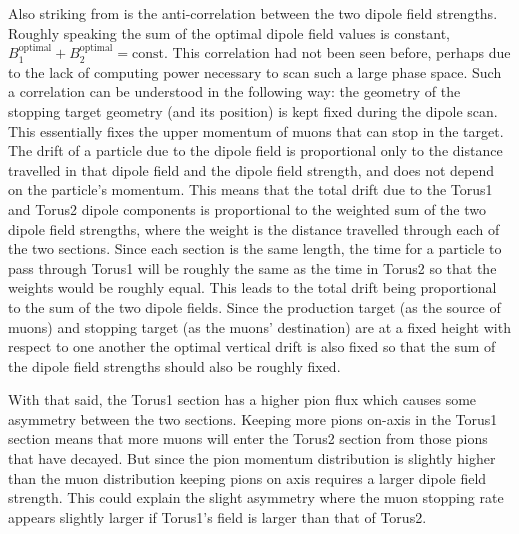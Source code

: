 Also striking from  is the anti-correlation between the two dipole field strengths.  
Roughly speaking the sum of the optimal dipole field values is constant, \ie $B_1^\text{optimal} + B_2^\text{optimal} = \text{const}$.
This correlation had not been seen before, perhaps due to the lack of computing power necessary to scan such a large phase space.
Such a correlation can be understood in the following way:
the geometry of the stopping target geometry (and its position) is kept fixed during the dipole scan.
This essentially fixes the upper momentum of muons that can stop in the target.
The drift of a particle due to the dipole field is proportional only to the distance travelled in that dipole field and the dipole field strength, and does not depend on the particle's momentum.
This means that the total drift due to the Torus1 and Torus2 dipole components is proportional to the weighted sum of the two dipole field strengths, where the weight is the distance travelled through each of the two sections.
Since each section is the same length, the time for a particle to pass through Torus1 will be roughly the same as the time in Torus2 so that the weights would be roughly equal.
This leads to the total drift being proportional to the sum of the two dipole fields.
Since the production target (as the source of muons) and stopping target (as the muons' destination) are at a fixed height with respect to one another the optimal vertical drift is also fixed so that the sum of the dipole field strengths should also be roughly fixed.

With that said, the Torus1 section has a higher pion flux which causes some asymmetry between the two sections.
Keeping more pions on-axis in the Torus1 section means that more muons will enter the Torus2 section from those pions that have decayed.
But since the pion momentum distribution is slightly higher than the muon distribution keeping pions on axis requires a larger dipole field strength.
This could explain the slight asymmetry where the muon stopping rate appears slightly larger if Torus1's field is larger than that of Torus2.

